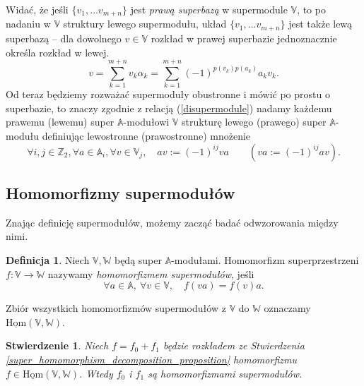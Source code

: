 \documentclass[11pt,a4paper]{report}
\newtheorem{proposition}[theorem]{Stwierdzenie}
\theoremstyle{definition}
\newtheorem{definition}[theorem]{Definicja}
\begin{document}
Widać, że jeśli $\{ v_1, \ldots v_{m+n} \}$ jest \textit{prawą superbazą} w supermodule $\mathbb{V}$, to po nadaniu w $\mathbb{V}$ struktury lewego supermodułu, układ $\{ v_1, \ldots v_{m+n} \}$ jest także lewą superbazą -- dla dowolnego $v\in \mathbb{V}$ rozkład w prawej superbazie jednoznacznie określa rozkład w lewej.
\begin{equation*}
	v = \sum_{k=1}^{m+n} v_k \alpha_k = \sum_{k=1}^{m+n} (-1)^{p(v_k)p(a_k)} a_k v_k.
\end{equation*}
Od teraz będziemy rozważać supermoduły obustronne i mówić po prostu o superbazie, to znaczy zgodnie z relacją (\ref{disupermodule}) nadamy każdemu prawemu (lewemu) super $\mathbb{A}$-modułowi $\mathbb{V}$ strukturę lewego (prawego) super $\mathbb{A}$-modułu definiując lewostronne (prawostronne) mnożenie
\begin{equation*}
	\forall i,j \in \mathbb{Z}_2, \forall a \in \mathbb{A}_i, \forall v \in \mathbb{V}_j, \quad av := (-1)^{ij}va \qquad \left( va := (-1)^{ij}av \right).
\end{equation*}

\subsection{Homomorfizmy supermodułów}

Znając definicję supermodułów, możemy zacząć badać odwzorowania między nimi.

\begin{definition}
	\label{superlinear_morphism}
	Niech $\mathbb{V}, \mathbb{W}$ będą super $\mathbb{A}$-modułami. Homomorfizm superprzestrzeni $f: \mathbb{V} \rightarrow \mathbb{W}$ nazywamy \textit{homomorfizmem supermodułów}, jeśli 
	\begin{equation}
		\label{superlinear_morphism_property}
		\forall a \in \mathbb{A},\ \forall v \in \mathbb{V}, \quad f(va) = f(v)a.
	\end{equation}
\end{definition}

Zbiór wszystkich homomorfizmów supermodułów z $\mathbb{V}$ do $\mathbb{W}$  oznaczamy $\underline{\mathrm{Hom}}(\mathbb{V},\mathbb{W})$.

\begin{proposition}
	Niech $f = f_0 + f_1$ będzie rozkładem ze Stwierdzenia \ref{super_homomorphism_decomposition_proposition} homomorfizmu $f \in \underline{\mathrm{Hom}}(\mathbb{V},\mathbb{W})$. Wtedy $f_0$ i $f_1$ są homomorfizmami supermodułów.
\end{proposition}
\end{document}
